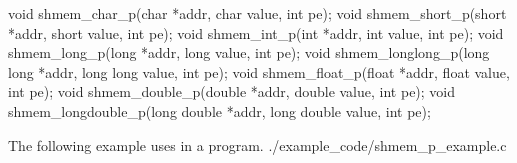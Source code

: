 
\begin{apidefinition}

\begin{Csynopsis}
void shmem_char_p(char *addr, char value, int pe);
void shmem_short_p(short *addr, short value, int pe);
void shmem_int_p(int *addr, int value, int pe);
void shmem_long_p(long *addr, long value, int pe);
void shmem_longlong_p(long long *addr, long long value, int pe);
void shmem_float_p(float *addr, float value, int pe);
void shmem_double_p(double *addr, double value, int pe);
void shmem_longdouble_p(long double *addr, long double value, int pe);
\end{Csynopsis}

\begin{apiarguments}
\end{apiarguments}




\begin{apiexamples}

    \apicexample
    {The following example uses   in a \Clang{} program.}	 
    {./example_code/shmem_p_example.c}
    {}

\end{apiexamples}

\end{apidefinition}
